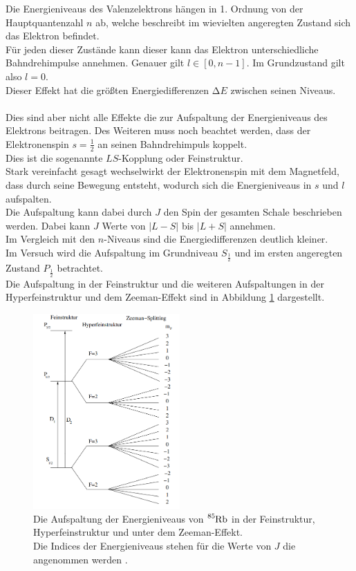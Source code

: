 \noindent
Die Energieniveaus des Valenzelektrons hängen in 1. Ordnung von der Hauptquantenzahl $n$ ab, welche beschreibt im wievielten angeregten Zustand sich das Elektron befindet.\\
Für jeden dieser Zustände kann dieser kann das Elektron unterschiedliche Bahndrehimpulse annehmen. Genauer gilt $l \in [0, n-1]$. Im Grundzustand gilt also $l = 0$.\\
Dieser Effekt hat die größten Energiedifferenzen $\increment E$ zwischen seinen Niveaus.\\\\
Dies sind aber nicht alle Effekte die zur Aufspaltung der Energieniveaus des Elektrons beitragen.
Des Weiteren muss noch beachtet werden, dass der Elektronenspin $s =\frac{1}{2}$ an seinen Bahndrehimpuls koppelt.\\
Dies ist die sogenannte $LS$-Kopplung oder Feinstruktur. \\
Stark vereinfacht gesagt wechselwirkt der Elektronenspin mit dem Magnetfeld, dass durch seine Bewegung entsteht, wodurch sich die Energieniveaus in $s$ und $l$ aufspalten.\\
Die Aufspaltung kann dabei durch $J$ den Spin der gesamten Schale beschrieben werden. Dabei kann $J$ Werte von $\bigl| L - S \bigr|$ bis $\bigl| L + S \bigr|$ annehmen.\\
Im Vergleich mit den $n$-Niveaus sind die Energiedifferenzen deutlich kleiner.\\
Im Versuch wird die Aufspaltung im Grundniveau $S_{\frac{1}{2}}$ und im ersten angeregten Zustand $P_\frac{1}{2}$ betrachtet.\\
Die Aufspaltung in der Feinstruktur und die weiteren Aufspaltungen in der Hyperfeinstruktur und dem Zeeman-Effekt sind in Abbildung \ref{img:aufspaltung} dargestellt.
\begin{figure}[H]
    \centering
    \includegraphics[width=0.5\textwidth]{latex/images/energy_levels_85.PNG}
    \caption{Die Aufspaltung der Energieniveaus von $\ce{^{85}Rb}$ in der Feinstruktur, Hyperfeinstruktur und unter dem Zeeman-Effekt.\\
    Die Indices der Energieniveaus stehen für die Werte von $J$ die angenommen werden \protect \cite{pump_2}.}
    \label{img:aufspaltung}
\end{figure}

